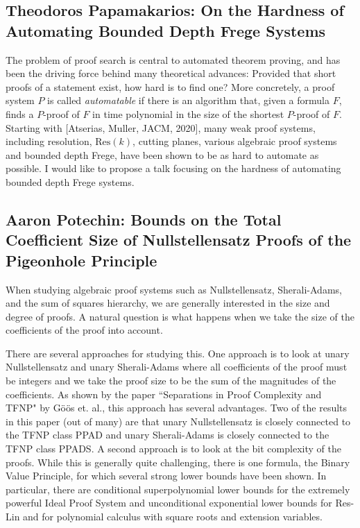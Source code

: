 \documentclass[11pt]{article}
\begin{document}
\subsection*{Theodoros Papamakarios: On the Hardness of Automating Bounded Depth Frege Systems}\label{Papamakarios}
The problem of proof search is central to automated theorem proving, and has been the driving force behind many theoretical advances: Provided that short proofs of a statement exist, how hard is to find one? More concretely, a proof system $P$ is called \emph{automatable} if there is an algorithm that, given a formula $F$, finds a $P$-proof of $F$ in time polynomial in the size of the shortest $P$-proof of $F$. Starting with [Atserias, Muller, JACM, 2020], many weak proof systems, including resolution, $\mathrm{Res}(k)$, cutting planes, various algebraic proof systems and bounded depth Frege, have been shown to be as hard to automate as possible. I would like to propose a talk focusing on the hardness of automating bounded depth Frege systems.

\subsection*{Aaron Potechin: Bounds on the Total Coefficient Size of Nullstellensatz Proofs of the Pigeonhole Principle}\label{Potechin}

When studying algebraic proof systems such as Nullstellensatz, Sherali-Adams, and the sum of squares hierarchy, we are generally interested in the size and degree of proofs. A natural question is what happens when we take the size of the coefficients of the proof into account. 

There are several approaches for studying this. One approach is to look at unary Nullstellensatz and unary Sherali-Adams where all coefficients of the proof must be integers and we take the proof size to be the sum of the magnitudes of the coefficients. As shown by the paper ``Separations in Proof Complexity and TFNP" by Göös et. al., this approach has several advantages. Two of the results in this paper (out of many) are that unary Nullstellensatz is closely connected to the TFNP class PPAD and unary Sherali-Adams is closely connected to the TFNP class PPADS. A second approach is to look at the bit complexity of the proofs. While this is generally quite challenging, there is one formula, the Binary Value Principle, for which several strong lower bounds have been shown. In particular, there are conditional superpolynomial lower bounds for the extremely powerful Ideal Proof System and unconditional exponential lower bounds for Res-Lin and for polynomial calculus with square roots and extension variables.
\end{document}
